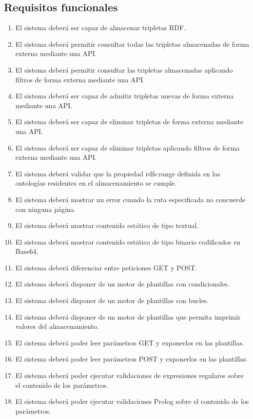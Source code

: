 \documentclass[12pt]{report} %
\begin{document}
\subsection{Requisitos funcionales}
\begin{enumerate}
    \item El sistema deberá ser capaz de almacenar tripletas RDF.
    \item El sistema deberá permitir consultar todas las tripletas almacenadas de forma externa mediante una API.
    \item El sistema deberá permitir consultar las tripletas almacenadas aplicando filtros de forma externa mediante una API.
    \item El sistema deberá ser capaz de admitir tripletas nuevas de forma externa mediante una API.
    \item El sistema deberá ser capaz de eliminar tripletas de forma externa mediante una API.
    \item El sistema deberá ser capaz de eliminar tripletas aplicando filtros de forma externa mediante una API.
    \item El sistema deberá validar que la propiedad rdfs:range definida en las ontologías residentes en el almacenamiento se cumple.
    \item El sistema deberá mostrar un error cuando la ruta especificada no concuerde con ninguna página.
    \item El sistema deberá mostrar contenido estático de tipo textual.
    \item El sistema deberá mostrar contenido estático de tipo binario codificados en Base64.
    \item El sistema deberá diferenciar entre peticiones GET y POST.
    \item El sistema deberá disponer de un motor de plantillas con condicionales.
    \item El sistema deberá disponer de un motor de plantillas con bucles.
    \item El sistema deberá disponer de un motor de plantillas que permita imprimir valores del almacenamiento.
    \item El sistema deberá poder leer parámetros GET y exponerlos en las plantillas.
    \item El sistema deberá poder leer parámetros POST y exponerlos en las plantillas.
    \item El sistema deberá poder ejecutar validaciones de expresiones regulares sobre el contenido de los parámetros.
    \item El sistema deberá poder ejecutar validaciones Prolog sobre el contenido de los parámetros. 

\end{enumerate}
\end{document}
